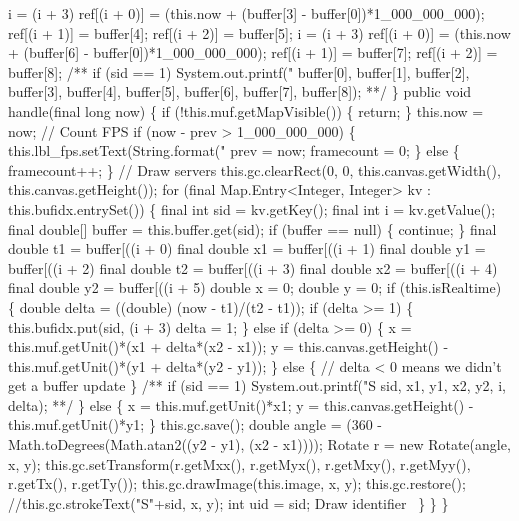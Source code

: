     i = (i + 3) %
    ref[(i + 0)] = (this.now + (buffer[3] - buffer[0])*1_000_000_000);
    ref[(i + 1)] = buffer[4];
    ref[(i + 2)] = buffer[5];
    i = (i + 3) %
    ref[(i + 0)] = (this.now + (buffer[6] - buffer[0])*1_000_000_000);
    ref[(i + 1)] = buffer[7];
    ref[(i + 2)] = buffer[8];
/**
if (sid == 1) System.out.printf("%
    buffer[0],
    buffer[1],
    buffer[2],
    buffer[3],
    buffer[4],
    buffer[5],
    buffer[6],
    buffer[7],
    buffer[8]);
**/
  \}
  public void handle(final long now) \{
    if (!this.muf.getMapVisible()) \{
      return;
    \}
    this.now = now;
    // Count FPS
    if (now - prev > 1_000_000_000) \{
      this.lbl_fps.setText(String.format("%
      prev = now;
      framecount = 0;
    \} else \{
      framecount++;
    \}
    // Draw servers
    this.gc.clearRect(0, 0, this.canvas.getWidth(), this.canvas.getHeight());
    for (final Map.Entry<Integer, Integer> kv : this.bufidx.entrySet()) \{
      final int sid = kv.getKey();
      final int i = kv.getValue();
      final double[] buffer = this.buffer.get(sid);
      if (buffer == null) \{
        continue;
      \}
      final double t1 = buffer[((i + 0) %
      final double x1 = buffer[((i + 1) %
      final double y1 = buffer[((i + 2) %
      final double t2 = buffer[((i + 3) %
      final double x2 = buffer[((i + 4) %
      final double y2 = buffer[((i + 5) %
      double x = 0;
      double y = 0;
      if (this.isRealtime) \{
        double delta = ((double) (now - t1)/(t2 - t1));
        if (delta >= 1) \{
          this.bufidx.put(sid, (i + 3) %
          delta = 1;
        \} else if (delta >= 0) \{
          x = this.muf.getUnit()*(x1 + delta*(x2 - x1));
          y = this.canvas.getHeight() - this.muf.getUnit()*(y1 + delta*(y2 - y1));
        \} else \{
          // delta < 0 means we didn't get a buffer update
        \}
/**
if (sid == 1) System.out.printf("S%
    sid, x1, y1, x2, y2, i, delta);
**/
      \} else \{
        x = this.muf.getUnit()*x1;
        y = this.canvas.getHeight() - this.muf.getUnit()*y1;
      \}
      this.gc.save();
      double angle = (360 - Math.toDegrees(Math.atan2((y2 - y1), (x2 - x1))));
      Rotate r = new Rotate(angle, x, y);
      this.gc.setTransform(r.getMxx(), r.getMyx(), r.getMxy(), r.getMyy(), r.getTx(), r.getTy());
      this.gc.drawImage(this.image, x, y);
      this.gc.restore();
      //this.gc.strokeText("S"+sid, x, y);
      int uid = sid;
      \LA{}Draw identifier~{\nwtagstyle{}}\RA{}
    \}
  \}
\}
\nwendcode{}\nwdocspar

